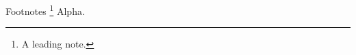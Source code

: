 \documentclass[aspectratio=169]{beamer}
\begin{document}
\begin{frame}{Footnotes}
\footnote{A leading note.} Alpha.
\end{frame}
\end{document}

